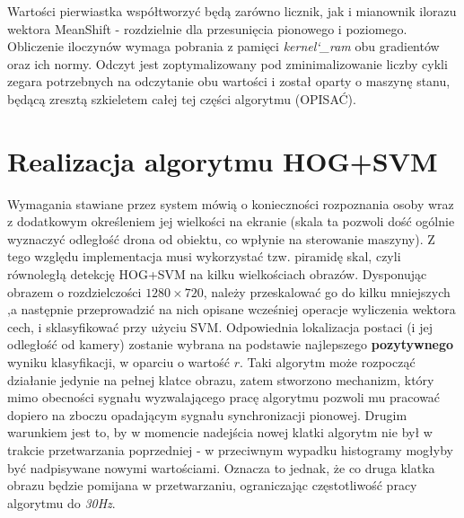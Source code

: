 Wartości pierwiastka współtworzyć będą zarówno licznik, jak i mianownik ilorazu wektora MeanShift - rozdzielnie dla przesunięcia pionowego i poziomego. Obliczenie iloczynów wymaga pobrania z pamięci \textit{kernel\char`_ram} obu gradientów oraz ich normy. Odczyt jest zoptymalizowany pod zminimalizowanie liczby cykli zegara potrzebnych na odczytanie obu wartości i został oparty o maszynę stanu, będącą zresztą szkieletem całej tej części algorytmu (OPISAĆ).


\section{Realizacja algorytmu HOG+SVM}

Wymagania stawiane przez system mówią o konieczności rozpoznania osoby wraz z dodatkowym określeniem jej wielkości na ekranie (skala ta pozwoli dość ogólnie wyznaczyć odległość drona od obiektu, co wpłynie na sterowanie maszyny). Z tego względu implementacja musi wykorzystać tzw. piramidę skal, czyli równoległą detekcję HOG+SVM na kilku wielkościach obrazów. Dysponując obrazem o rozdzielczości $1280 \times720$, należy przeskalować go do kilku mniejszych ,a następnie przeprowadzić na nich opisane wcześniej operacje wyliczenia wektora cech, i sklasyfikować przy użyciu SVM. Odpowiednia lokalizacja postaci (i jej odległość od kamery) zostanie wybrana na podstawie najlepszego \textbf{pozytywnego} wyniku klasyfikacji, w oparciu o wartość $r$.\newline
Taki algorytm może rozpocząć działanie jedynie na pełnej klatce obrazu, zatem stworzono mechanizm, który mimo obecności sygnału wyzwalającego pracę algorytmu pozwoli mu pracować dopiero na zboczu opadającym sygnału synchronizacji pionowej. Drugim warunkiem jest to, by w momencie nadejścia nowej klatki algorytm nie był w trakcie przetwarzania poprzedniej - w przeciwnym wypadku histogramy mogłyby być nadpisywane nowymi wartościami. Oznacza to jednak, że co druga klatka obrazu będzie pomijana w przetwarzaniu, ograniczając częstotliwość pracy algorytmu do \textit{30Hz}.

